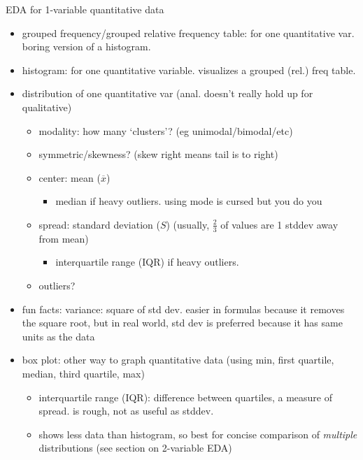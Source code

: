 \documentclass[11pt]{article}
\begin{document}
\newpage
EDA for 1-variable quantitative data
\begin{itemize}
  \item grouped frequency/grouped relative frequency table: for one quantitative var. boring version of a histogram. 
  \item histogram: for one quantitative variable. visualizes a grouped (rel.) freq table.
  \item distribution of one quantitative var (anal. doesn't really hold up for qualitative)
  \begin{itemize}
    \item modality: how many `clusters'? (eg unimodal/bimodal/etc)
    \item symmetric/skewness? (skew right means tail is to right)
    \item center: mean ($\overline{x}$)
    \begin{itemize}
      \item median if heavy outliers. using mode is cursed but you do you
    \end{itemize}
    \item spread: standard deviation ($S$) (usually, $\frac{2}{3}$ of values are 1 stddev away from mean)
    \begin{itemize}
      \item interquartile range (IQR) if heavy outliers.
    \end{itemize}
    \item outliers?
  \end{itemize}
  \item fun facts: variance: square of std dev. easier in formulas because it removes the square root, but in real world, std dev is preferred because it has same units as the data
  \item box plot: other way to graph quantitative data (using min, first quartile, median, third quartile, max) 
  \begin{itemize}
    \item interquartile range (IQR): difference between quartiles, a measure of spread. is rough, not as useful as stddev.
    \item shows less data than histogram, so best for concise comparison of \emph{multiple} distributions (see section on 2-variable EDA)
  \end{itemize}
\end{itemize}
\end{document}
